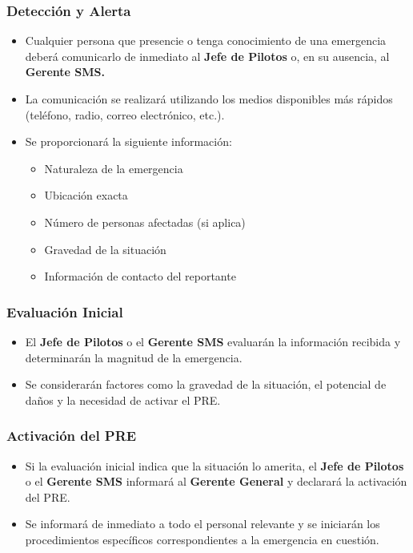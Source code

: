 \subsubsection{Detección y Alerta}
\begin{itemize}
    \item Cualquier persona que presencie o tenga conocimiento de una emergencia deberá comunicarlo de inmediato al \textbf{Jefe de Pilotos} o, en su ausencia, al \textbf{Gerente SMS.}
    \item La comunicación se realizará utilizando los medios disponibles más rápidos (teléfono, radio, correo electrónico, etc.).
    \item Se proporcionará la siguiente información:
        \begin{itemize}
            \item Naturaleza de la emergencia
            \item Ubicación exacta
            \item Número de personas afectadas (si aplica)
            \item Gravedad de la situación
            \item Información de contacto del reportante
        \end{itemize}
\end{itemize}

\subsubsection{Evaluación Inicial}
\begin{itemize}
    \item El \textbf{Jefe de Pilotos} o el \textbf{Gerente SMS} evaluarán la información recibida y determinarán la magnitud de la emergencia.
    \item Se considerarán factores como la gravedad de la situación, el potencial de daños y la necesidad de activar el PRE.
\end{itemize}

\subsubsection{Activación del PRE}
\begin{itemize}
    \item Si la evaluación inicial indica que la situación lo amerita, el \textbf{Jefe de Pilotos} o el \textbf{Gerente SMS} informará al \textbf{Gerente General} y declarará la activación del PRE.
    \item Se informará de inmediato a todo el personal relevante y se iniciarán los procedimientos específicos correspondientes a la emergencia en cuestión.
\end{itemize}

